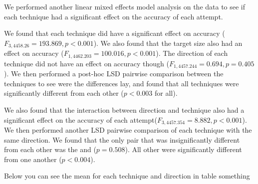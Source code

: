 We performed another linear mixed effects model analysis on the data to see if each technique had a significant effect on the accuracy of each attempt. 

We found that each technique did have a significant effect on accuracy ($F_{3,4458.26}=193.869, p<0.001$).
We also found that the target size also had an effect on accuracy ($F_{1,4462.203}=100.016, p<0.001$).
The direction of each technique did not have an effect on accuracy though ($F_{1,4457.244}=0.694, p=0.405$). 
We then performed a post-hoc LSD pairwise comparison between the techniques to see were the differences lay, and found that all techniques were significantly different from each other ($p<0.003$ for all).

We also found that the interaction between direction and technique also had a significant effect on the accuracy of each attempt($F_{3,4457.354}=8.882, p<0.001$). 
We then performed another LSD pairwise comparison of each technique with the same direction. 
We found that the only pair that was insignificantly different from each other was the \push \grab and \throw ($p=0.508$). 
All other were significantly different from one another ($p<0.004$). 

Below you can see the mean for each technique and direction in table something 
